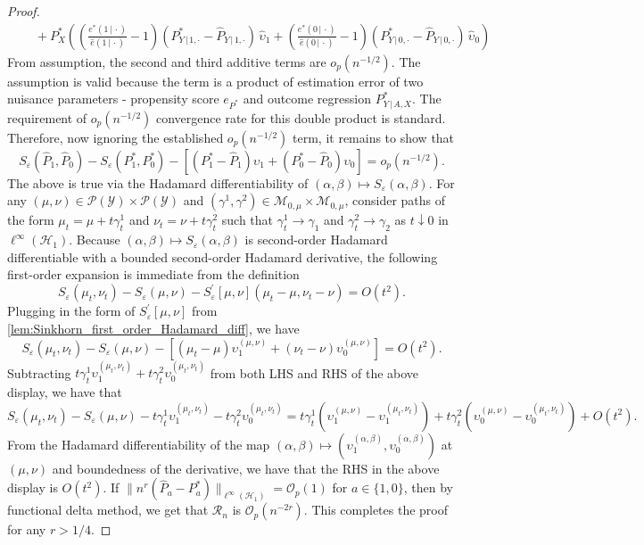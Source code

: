 \documentclass[10pt,a4paper]{amsart}
\newcommand{\cH}{\mathcal{H}}
\newcommand{\cM}{\mathcal{M}}
\newcommand{\cO}{\mathcal{O}}
\newcommand{\cP}{\mathcal{P}}
\newcommand{\cR}{\mathcal{R}}
\newcommand{\cY}{\mathcal{Y}}
\newcommand{\eps}{\varepsilon}
\newcommand{\hP}{\widehat{P}}
\newcommand{\mymid}{\,|\,}
\newcommand{\of}[1]{\left(#1\right)}
\newcommand{\off}[1]{\left[#1\right]}
\newcommand{\wh}[1]{\widehat{#1}}
\begin{document}
\begin{proof}
\begin{align*}
     & \quad + P^*_X \of{\of{\frac{e^*(1 \mymid \cdot)}{\hat{e}(1 \mymid \cdot)}-1} (P^*_{Y \mymid 1, \cdot} - \hP_{Y \mymid 1, \cdot}) \,\wh\upsilon_1 + \of{\frac{e^*(0 \mymid \cdot)}{\hat{e}(0 \mymid \cdot)}-1} (P^*_{Y \mymid 0, \cdot} - \hP_{Y \mymid 0, \cdot}) \, \wh\upsilon_0}
\end{align*}
From assumption, the second and third additive terms are $o_p(n^{-1/2})$. The assumption is valid because the term is a product of estimation error of two nuisance parameters - propensity score $e_{P^*}$ and outcome regression $P^*_{Y \mymid A, X}$. The requirement of $o_p(n^{-1/2})$ convergence rate for this double product is standard. Therefore, now ignoring the established $o_p(n^{-1/2})$ term, it remains to show that
\begin{equation}\label{eq:sinkhorn_remainder}
    S_\eps(\hP_1, \hP_0) - S_\eps(P_1^*, P_0^*) - \off{(P_1^* - \hP_1) \upsilon_1 + (P_0^*-\hP_0) \upsilon_0} = o_p(n^{-1/2}).
\end{equation}
The above is true via the Hadamard differentiability of $(\alpha, \beta) \mapsto S_\eps(\alpha, \beta)$.
For any $(\mu, \nu) \in \cP(\cY) \times \cP(\cY)$ and $(\gamma^1, \gamma^2) \in \cM_{0, \mu} \times \cM_{0, \mu}$, consider paths of the form $\mu_t = \mu + t \gamma_t^1$ and $\nu_t = \nu + t \gamma_t^2$ such that $\gamma_t^1 \to \gamma_1$ and $\gamma_t^2 \to \gamma_2$ as $t \downarrow 0$ in $\ell^\infty(\cH_1)$. Because $(\alpha, \beta) \mapsto S_\eps(\alpha, \beta)$ is second-order Hadamard differentiable with a bounded second-order Hadamard derivative, the following first-order expansion is immediate from the definition
\[
S_\eps(\mu_t, \nu_t)- S_\eps(\mu, \nu) - S_\eps^\prime[\mu, \nu](\mu_t - \mu, \nu_t - \nu) = O(t^2).
\]
Plugging in the form of $S_\eps^\prime[\mu, \nu]$ from \cref{lem:Sinkhorn_first_order_Hadamard_diff}, we have
\[
S_\eps(\mu_t, \nu_t)- S_\eps(\mu, \nu) - \off{(\mu_t - \mu)\upsilon_1^{(\mu, \nu)} + (\nu_t - \nu) \upsilon_0^{(\mu, \nu)}} = O(t^2).
\]
Subtracting $t\gamma_t^1 \upsilon_1^{(\mu_t, \nu_t)} + t\gamma_t^2 \upsilon_0^{(\mu_t, \nu_t)}$ from both LHS and RHS of the above display, we have that 
\[
S_\eps(\mu_t, \nu_t)- S_\eps(\mu, \nu) -t \gamma_t^1 \upsilon_1^{(\mu_t, \nu_t)} - t \gamma_t^2 \upsilon_0^{(\mu_t, \nu_t)} = 
t \gamma_t^1 (\upsilon_1^{(\mu, \nu)} - \upsilon_1^{(\mu_t, \nu_t)}) +t \gamma_t^2 (\upsilon_0^{(\mu, \nu)} - \upsilon_0^{(\mu_t, \nu_t)}) + O(t^2).
\]
From the Hadamard differentiability of the map $(\alpha, \beta) \mapsto (\upsilon_1^{(\alpha, \beta)}, \upsilon_0^{(\alpha, \beta)})$ at $(\mu, \nu)$ and boundedness of the derivative, we have that the RHS in the above display is $O(t^2)$. If $\|n^r(\hP_a - P^*_a)\|_{\ell^\infty(\cH_1)} = \cO_p(1)$ for $a \in \{1,0\}$, then by functional delta method, we get that $\cR_n$ is $\cO_p(n^{-2r})$. This completes the proof for any $r > 1/4$.
\end{proof}
\end{document}
